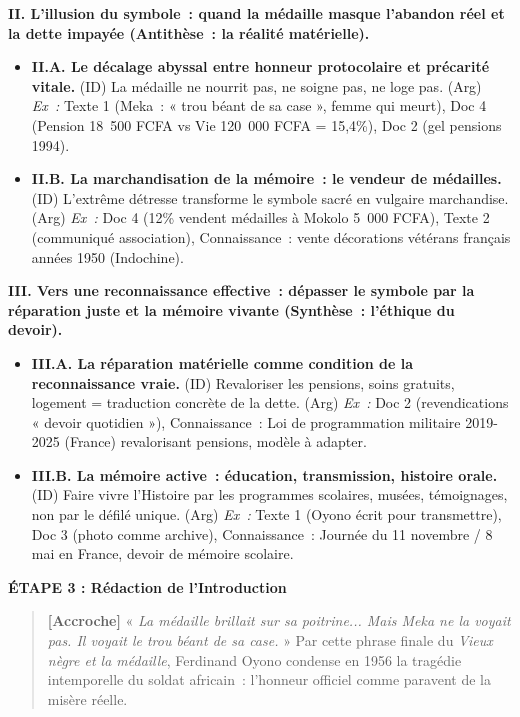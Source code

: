 \documentclass[11pt]{article}
\begin{document}
\begin{exoresolu}
\textbf{II. L'illusion du symbole~: quand la médaille masque l'abandon réel et la dette impayée (Antithèse~: la réalité matérielle).}
\begin{itemize}
    \item \textbf{II.A. Le décalage abyssal entre honneur protocolaire et précarité vitale.} (ID) La médaille ne nourrit pas, ne soigne pas, ne loge pas. (Arg) \emph{Ex~:} Texte 1 (Meka~: « trou béant de sa case », femme qui meurt), Doc 4 (Pension 18~500 FCFA vs Vie 120~000 FCFA = 15,4\%), Doc 2 (gel pensions 1994).
    \item \textbf{II.B. La marchandisation de la mémoire~: le vendeur de médailles.} (ID) L'extrême détresse transforme le symbole sacré en vulgaire marchandise. (Arg) \emph{Ex~:} Doc 4 (12\% vendent médailles à Mokolo 5~000 FCFA), Texte 2 (communiqué association), Connaissance~: vente décorations vétérans français années 1950 (Indochine).
\end{itemize}

\textbf{III. Vers une reconnaissance effective~: dépasser le symbole par la réparation juste et la mémoire vivante (Synthèse~: l'éthique du devoir).}
\begin{itemize}
    \item \textbf{III.A. La réparation matérielle comme condition de la reconnaissance vraie.} (ID) Revaloriser les pensions, soins gratuits, logement = traduction concrète de la dette. (Arg) \emph{Ex~:} Doc 2 (revendications « devoir quotidien »), Connaissance~: Loi de programmation militaire 2019-2025 (France) revalorisant pensions, modèle à adapter.
    \item \textbf{III.B. La mémoire active~: éducation, transmission, histoire orale.} (ID) Faire vivre l'Histoire par les programmes scolaires, musées, témoignages, non par le défilé unique. (Arg) \emph{Ex~:} Texte 1 (Oyono écrit pour transmettre), Doc 3 (photo comme archive), Connaissance~: Journée du 11 novembre / 8 mai en France, devoir de mémoire scolaire.
\end{itemize}

\textbf{ÉTAPE 3 : Rédaction de l'Introduction}

\begin{quote}
\textbf{[Accroche]} « \emph{La médaille brillait sur sa poitrine... Mais Meka ne la voyait pas. Il voyait le trou béant de sa case.} » Par cette phrase finale du \emph{Vieux nègre et la médaille}, Ferdinand Oyono condense en 1956 la tragédie intemporelle du soldat africain~: l'honneur officiel comme paravent de la misère réelle. 


\end{quote}
\end{exoresolu}
\end{document}
